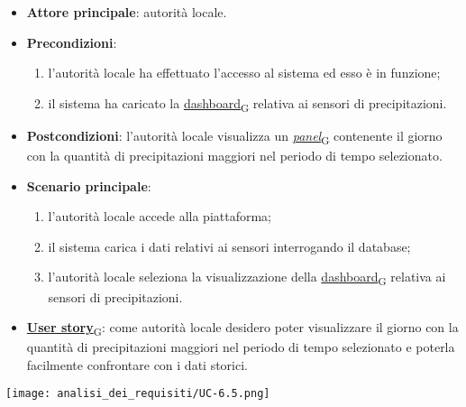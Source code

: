 \newpage

\begin{itemize}
	\item \textbf{Attore principale}: autorità locale.
	\item \textbf{Precondizioni}:
	      \begin{enumerate}
		      \item l'autorità locale ha effettuato l'accesso al sistema ed esso è in funzione;
		      \item il sistema ha caricato la \href{https://7last.github.io/docs/rtb/documentazione-interna/glossario\#dashboard}{dashboard\textsubscript{G}} relativa ai sensori di precipitazioni.
	      \end{enumerate}
	\item \textbf{Postcondizioni}: l'autorità locale visualizza un \href{https://7last.github.io/docs/rtb/documentazione-interna/glossario\#panel}{\textit{panel}\textsubscript{G}} contenente il giorno con la quantità di precipitazioni maggiori nel periodo di tempo selezionato.
	\item \textbf{Scenario principale}:
	      \begin{enumerate}
		      \item l'autorità locale accede alla piattaforma;
		      \item il sistema carica i dati relativi ai sensori interrogando il database;
		      \item l'autorità locale seleziona la visualizzazione della \href{https://7last.github.io/docs/rtb/documentazione-interna/glossario\#dashboard}{dashboard\textsubscript{G}} relativa ai sensori di precipitazioni.
	      \end{enumerate}
	\item \href{https://7last.github.io/docs/rtb/documentazione-interna/glossario\#user-story}{\textbf{User story}\textsubscript{G}}:
	      come autorità locale desidero poter visualizzare il giorno con la quantità di precipitazioni maggiori nel periodo di tempo selezionato
	      e poterla facilmente confrontare con i dati storici.
\end{itemize}
\begin{center}
	\texttt{[image: analisi\_dei\_requisiti/UC-6.5.png]}
\end{center}

